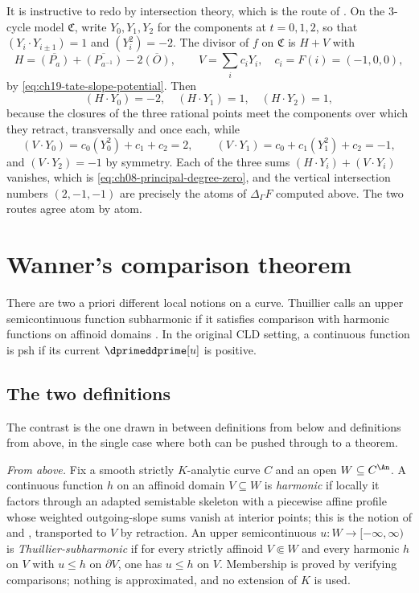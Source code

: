 \begin{example}
\label{ex:ch19-tate-slope-model}
It is instructive to redo  by intersection theory,
which is the route of .  On the $3$-cycle
model $\mathfrak C$, write $Y_0,Y_1,Y_2$ for the components at
$t=0,1,2$, so that $(Y_i\cdot Y_{i\pm1})=1$ and $(Y_i^2)=-2$.  The
divisor of $f$ on $\mathfrak C$ is $H+V$ with
\[
 H=\overline{(P_a)}+\overline{(P_{a^{-1}})}-2\overline{(O)},
 \qquad
 V=\sum_ic_iY_i,\quad c_i=F(i)=(-1,0,0),
\]
by \eqref{eq:ch19-tate-slope-potential}.  Then
\[
 (H\cdot Y_0)=-2,\quad (H\cdot Y_1)=1,\quad (H\cdot Y_2)=1,
\]
because the closures of the three rational points meet the components over
which they retract, transversally and once each, while
\[
 (V\cdot Y_0)=c_0(Y_0^2)+c_1+c_2=2,
 \qquad
 (V\cdot Y_1)=c_0+c_1(Y_1^2)+c_2=-1,
\]
and $(V\cdot Y_2)=-1$ by symmetry.  Each of the three sums
$(H\cdot Y_i)+(V\cdot Y_i)$ vanishes, which is
\eqref{eq:ch08-principal-degree-zero}, and the vertical intersection numbers
$(2,-1,-1)$ are precisely the atoms of $\Delta_\Gamma F$ computed above.
The two routes agree atom by atom.
\end{example}

\section{Wanner's comparison theorem}
\label{sec:ch19-wanner}

There are two a priori different local notions on a curve.  Thuillier calls
an upper semicontinuous function subharmonic if it satisfies comparison with
harmonic functions on affinoid domains \cite[Def.~3.1.5]{Thu05}.  In the
original CLD setting, a continuous function is psh if its current
$\dprimeddprime[u]$ is positive.

\subsection{The two definitions}
\label{sec:ch19-wanner-definitions}

The contrast is the one drawn in  between
definitions from below and definitions from above, in the single case where
both can be pushed through to a theorem.

\emph{From above.}  Fix a smooth strictly $K$-analytic curve $C$ and an
open $W\subseteq C^{\An}$.  A continuous function $h$ on an affinoid
domain $V\subseteq W$ is \emph{harmonic} if locally it factors through
an adapted semistable skeleton with a piecewise affine profile whose
weighted outgoing-slope sums vanish at interior points; this is the notion of  and
, transported to $V$ by retraction.  An upper
semicontinuous $u:W\to[-\infty,\infty)$ is
\emph{Thuillier-subharmonic} if for every strictly affinoid $V\Subset W$
and every harmonic $h$ on $V$ with $u\leq h$ on $\partial V$, one
has $u\leq h$ on $V$.  Membership is proved by verifying comparisons;
nothing is approximated, and no extension of $K$ is used.

